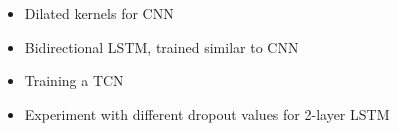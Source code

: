\begin{itemize}
\item Dilated kernels for CNN
\item Bidirectional LSTM, trained similar to CNN
\item Training a TCN \cite{intro}
\item Experiment with different dropout values for 2-layer LSTM
\end{itemize}
